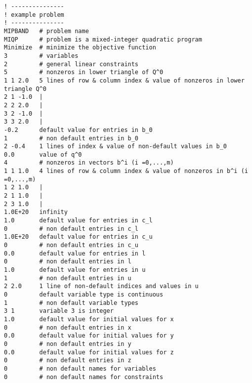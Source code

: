 {\small
\begin{verbatim}
! ---------------
! example problem
! ---------------
MIPBAND   # problem name
MIQP      # problem is a mixed-integer quadratic program
Minimize  # minimize the objective function
3         # variables
2         # general linear constraints
5         # nonzeros in lower triangle of Q^0
1 1 2.0   5 lines of row & column index & value of nonzeros in lower triangle Q^0
2 1 -1.0  |
2 2 2.0   |
3 2 -1.0  |
3 3 2.0   |
-0.2      default value for entries in b_0
1         # non default entries in b_0
2 -0.4    1 lines of index & value of non-default values in b_0
0.0       value of q^0
4         # nonzeros in vectors b^i (i =0,...,m)
1 1 1.0   4 lines of row & column index & value of nonzeros in b^i (i =0,...,m)
1 2 1.0   |
2 1 1.0   |
2 3 1.0   |
1.0E+20   infinity
1.0       default value for entries in c_l
0         # non default entries in c_l
1.0E+20   default value for entries in c_u
0         # non default entries in c_u
0.0       default value for entries in l
0         # non default entries in l
1.0       default value for entries in u
1         # non default entries in u
2 2.0     1 line of non-default indices and values in u
0         default variable type is continuous
1         # non default variable types
3 1       variable 3 is integer
1.0       default value for initial values for x
0         # non default entries in x
0.0       default value for initial values for y
0         # non default entries in y
0.0       default value for initial values for z
0         # non default entries in z
0         # non default names for variables
0         # non default names for constraints
\end{verbatim}
}



